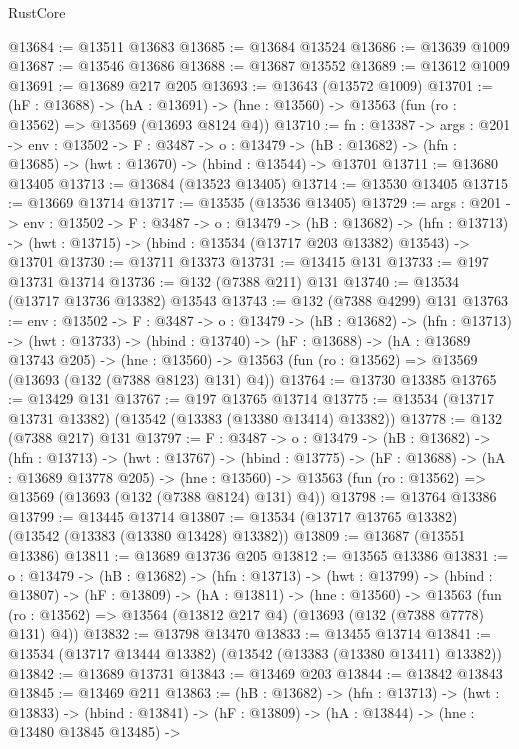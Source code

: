 \begin{lexlean}{RustCore}
\begin{coremodule}
@13684 := @13511 @13683
@13685 := @13684 @13524
@13686 := @13639 @1009
@13687 := @13546 @13686
@13688 := @13687 @13552
@13689 := @13612 @1009
@13691 := @13689 @217 @205
@13693 := @13643 (@13572 @1009)
@13701 := (hF : @13688) ->
  (hA : @13691) -> (hne : @13560) -> @13563 (fun (ro : @13562) => @13569 (@13693 @8124 @4))
@13710 := {fn : @13387} ->
  {args : @201} ->
  {env : @13502} ->
  {F : @3487} ->
  {o : @13479} -> (hB : @13682) -> (hfn : @13685) -> (hwt : @13670) -> (hbind : @13544) -> @13701
@13711 := @13680 @13405
@13713 := @13684 (@13523 @13405)
@13714 := @13530 @13405
@13715 := @13669 @13714
@13717 := @13535 (@13536 @13405)
@13729 := {args : @201} ->
  {env : @13502} ->
  {F : @3487} ->
  {o : @13479} ->
  (hB : @13682) ->
  (hfn : @13713) -> (hwt : @13715) -> (hbind : @13534 (@13717 @203 @13382) @13543) -> @13701
@13730 := @13711 @13373
@13731 := @13415 @131
@13733 := @197 @13731 @13714
@13736 := @132 (@7388 @211) @131
@13740 := @13534 (@13717 @13736 @13382) @13543
@13743 := @132 (@7388 @4299) @131
@13763 := {env : @13502} ->
  {F : @3487} ->
  {o : @13479} ->
  (hB : @13682) ->
  (hfn : @13713) ->
  (hwt : @13733) ->
  (hbind : @13740) ->
  (hF : @13688) ->
  (hA : @13689 @13743 @205) ->
  (hne : @13560) -> @13563 (fun (ro : @13562) => @13569 (@13693 (@132 (@7388 @8123) @131) @4))
@13764 := @13730 @13385
@13765 := @13429 @131
@13767 := @197 @13765 @13714
@13775 := @13534 (@13717 @13731 @13382) (@13542 (@13383 (@13380 @13414) @13382))
@13778 := @132 (@7388 @217) @131
@13797 := {F : @3487} ->
  {o : @13479} ->
  (hB : @13682) ->
  (hfn : @13713) ->
  (hwt : @13767) ->
  (hbind : @13775) ->
  (hF : @13688) ->
  (hA : @13689 @13778 @205) ->
  (hne : @13560) -> @13563 (fun (ro : @13562) => @13569 (@13693 (@132 (@7388 @8124) @131) @4))
@13798 := @13764 @13386
@13799 := @13445 @13714
@13807 := @13534 (@13717 @13765 @13382) (@13542 (@13383 (@13380 @13428) @13382))
@13809 := @13687 (@13551 @13386)
@13811 := @13689 @13736 @205
@13812 := @13565 @13386
@13831 := {o : @13479} ->
  (hB : @13682) ->
  (hfn : @13713) ->
  (hwt : @13799) ->
  (hbind : @13807) ->
  (hF : @13809) ->
  (hA : @13811) ->
  (hne : @13560) ->
  @13563 (fun (ro : @13562) => @13564 (@13812 @217 @4) (@13693 (@132 (@7388 @7778) @131) @4))
@13832 := @13798 @13470
@13833 := @13455 @13714
@13841 := @13534 (@13717 @13444 @13382) (@13542 (@13383 (@13380 @13411) @13382))
@13842 := @13689 @13731
@13843 := @13469 @203
@13844 := @13842 @13843
@13845 := @13469 @211
@13863 := (hB : @13682) ->
  (hfn : @13713) ->
  (hwt : @13833) ->
  (hbind : @13841) ->
  (hF : @13809) ->
  (hA : @13844) ->
  (hne : @13480 @13845 @13485) ->

\end{coremodule}
\end{lexlean}
